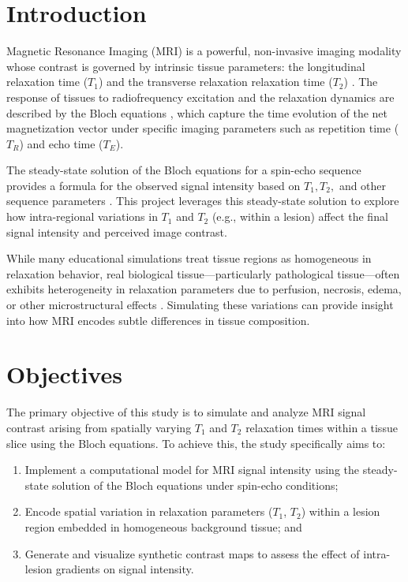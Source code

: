 \documentclass[10pt,a4paper,twoside]{article}
\begin{document}
\section{Introduction}\label{sec:intro}
Magnetic Resonance Imaging (MRI) is a powerful, non-invasive imaging modality whose contrast is governed by intrinsic tissue parameters: the longitudinal relaxation time ($T_1$) and the transverse relaxation relaxation time ($T_2$) \cite{brown2014}. The response of tissues to radiofrequency excitation and the relaxation dynamics are described by the Bloch equations \cite{bloch1946}, which capture the time evolution of the net magnetization vector under specific imaging parameters such as repetition time ($T_R$) and echo time ($T_E$).

The steady-state solution of the Bloch equations for a spin-echo sequence provides a formula for the observed signal intensity based on $T_1, T_2,$ and other sequence parameters \cite{bernstein2004}.  This project leverages this steady-state solution to explore how intra-regional variations in \(T_1\) and \(T_2\) (e.g., within a lesion) affect the final signal intensity and perceived image contrast.

While many educational simulations treat tissue regions as homogeneous in relaxation behavior, real biological tissue---particularly pathological tissue---often exhibits heterogeneity in relaxation parameters due to perfusion, necrosis, edema, or other microstructural effects \cite{tofts2003}. Simulating these variations can provide insight into how MRI encodes subtle differences in tissue composition.

\section{Objectives}\label{sec:objectives}
The primary objective of this study is to simulate and analyze MRI signal contrast arising from spatially varying \(T_1\) and \(T_2\) relaxation times within a tissue slice using the Bloch equations. To achieve this, the study specifically aims to:
\begin{enumerate}
    \item Implement a computational model for MRI signal intensity using the steady-state solution of the Bloch equations under spin-echo conditions;
    \item Encode spatial variation in relaxation parameters (\(T_1\), \(T_2\)) within a lesion region embedded in homogeneous background tissue; and
    \item Generate and visualize synthetic contrast maps to assess the effect of intra-lesion gradients on signal intensity.
\end{enumerate}
\end{document}
